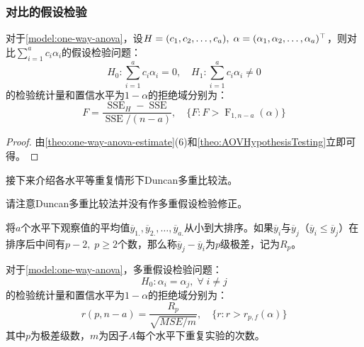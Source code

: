 \subsubsection{对比的假设检验}
\begin{theorem}
	对于\cref{model:one-way-anova}，设$H=(c_1, c_2, \dots, c_{a}),\;\alpha=(\alpha_1, \alpha_2, \dots, \alpha_{a})^{\top}$，则对比$\sum\limits_{i=1}^{a}c_i\alpha_i$的假设检验问题：
	\begin{equation*}
		H_0:\sum_{i=1}^{a}c_i\alpha_i=0,\quad H_1:\sum_{i=1}^{a}c_i\alpha_i\ne0
	\end{equation*}
	的检验统计量和置信水平为$1-\alpha$的拒绝域分别为：
	\begin{equation*}
		F=\frac{\operatorname{SSE}_H-\operatorname{SSE}}{\operatorname{SSE}/(n-a)},\quad\{F:F>\operatorname{F}_{1,n-a}(\alpha)\}
	\end{equation*}
\end{theorem}
\begin{proof}
	由\cref{theo:one-way-anova-estimate}(6)和\cref{theo:AOVHypothesisTesting}立即可得。
\end{proof}
接下来介绍各水平等重复情形下Duncan多重比较法。
\begin{note}
	请注意Duncan多重比较法并没有作多重假设检验修正。
\end{note}
\begin{definition}
	将$a$个水平下观察值的平均值$\overline{y}_{1.},\overline{y}_{2.},\dots,\overline{y}_{a.}$从小到大排序。如果$\overline{y}_i$与$\overline{y}_j$（$\overline{y}_i\leqslant\overline{y}_j$）在排序后中间有$p-2,\;p\geqslant2$个数，那么称$\overline{y}_j-\overline{y}_i$为$p$级极差，记为$R_p$。
\end{definition}
\begin{theorem}
	对于\cref{model:one-way-anova}，多重假设检验问题：
	\begin{equation*}
	H_0:\alpha_i=\alpha_j,\;\forall\;i\ne j
	\end{equation*}
	的检验统计量和置信水平为$1-\alpha$的拒绝域分别为：
	\begin{equation*}
		r(p,n-a)=\frac{R_p}{\sqrt{MSE/m}},\quad\{r:r>r_{p,f}(\alpha)\}
	\end{equation*}
	其中$p$为极差级数，$m$为因子$A$每个水平下重复实验的次数。
\end{theorem}
